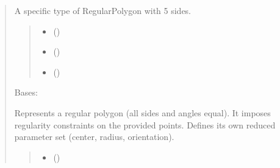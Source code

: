 \documentclass[letterpaper,10pt,english]{sphinxmanual}
\begin{document}
\begin{quote}
\begin{fulllineitems}
\sphinxAtStartPar
A specific type of RegularPolygon with 5 sides.
\begin{quote}\begin{description}
\begin{itemize}
\item {} 
\sphinxAtStartPar
{} ()

\item {} 
\sphinxAtStartPar
{} (\sphinxstyleliteralemphasis{\sphinxupquote{ | }})

\item {} 
\sphinxAtStartPar
{} (\sphinxstyleliteralemphasis{\sphinxupquote{ | }})

\end{itemize}

\end{description}\end{quote}

\end{fulllineitems}


\begin{fulllineitems}
\label{\detokenize{pygeox:pygeox.custom_objects.RegularPolygon}}
\pysigstartsignatures
\pysiglinewithargsret
{}
{\sphinxparamcomma {}\sphinxparamcomma {}\sphinxparamcomma {}}
{}
\pysigstopsignatures
\sphinxAtStartPar
Bases: 

\sphinxAtStartPar
Represents a regular polygon (all sides and angles equal).
It imposes regularity constraints on the provided points.
Defines its own reduced parameter set (center, radius, orientation).
\begin{quote}\begin{description}
\begin{itemize}
\item {} 
\sphinxAtStartPar
{} ()


\end{itemize}
\end{description}
\end{quote}
\end{fulllineitems}
\end{quote}
\end{document}
